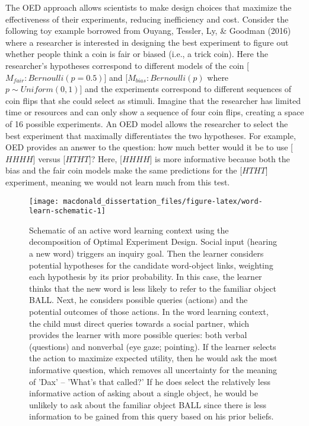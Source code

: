 \documentclass[oneside]{report}
\begin{document}
The OED approach allows scientists to make design choices that maximize
the effectiveness of their experiments, reducing inefficiency and cost.
Consider the following toy example borrowed from Ouyang, Tessler, Ly, \&
Goodman (2016) where a researcher is interested in designing the best
experiment to figure out whether people think a coin is fair or biased
(i.e., a trick coin). Here the researcher's hypotheses correspond to
different models of the coin {[}\(M_{fair}: Bernoulli(p = 0.5)\){]} and
{[}\(M_{bias}: Bernoulli(p)\) where \(p \sim Uniform(0,1)\){]} and the
experiments correspond to different sequences of coin flips that she
could select as stimuli. Imagine that the researcher has limited time or
resources and can only show a sequence of four coin flips, creating a
space of 16 possible experiments. An OED model allows the researcher to
select the best experiment that maximally differentiates the two
hypotheses. For example, OED provides an answer to the question: how
much better would it be to use {[}\(HHHH\){]} versus {[}\(HTHT\){]}?
Here, {[}\(HHHH\){]} is more informative because both the bias and the
fair coin models make the same predictions for the {[}\(HTHT\){]}
experiment, meaning we would not learn much from this test.
\begin{figure}[!t]

{\centering \texttt{[image: macdonald\_dissertation\_files/figure-latex/word-learn-schematic-1]} 

}

\caption[Schematic of an active word learning context.]{Schematic of an active word learning context using the decomposition of Optimal Experiment Design. Social input (hearing a new word) triggers an inquiry goal. Then the learner considers potential hypotheses for the candidate word-object links, weighting each hypothesis by its prior probability. In this case, the learner thinks that the new word is less likely to refer to the familiar object BALL. Next, he considers possible queries (actions) and the potential outcomes of those actions. In the word learning context, the child must direct queries towards a social partner, which provides the learner with more possible queries: both verbal (questions) and nonverbal (eye gaze; pointing). If the learner selects the action to maximize expected utility, then he would ask the most informative question, which removes all uncertainty for the meaning of 'Dax' -- 'What's that called?' If he does select the relatively less informative action of asking about a single object, he would be unlikely to ask about the familiar object BALL since there is less information to be gained from this query based on his prior beliefs.}\label{fig:word-learn-schematic}
\end{figure}
\end{document}

